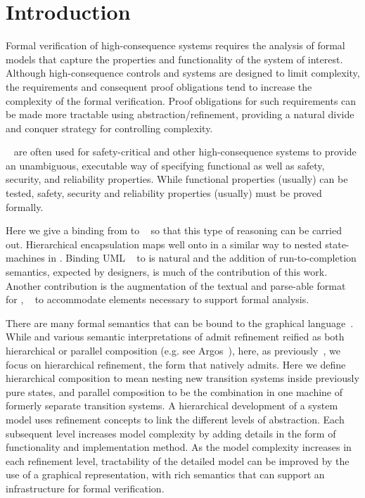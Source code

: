 
\section{Introduction}
\label{sec:introduction}

Formal verification of high-consequence systems requires the analysis
of formal models that capture the properties and functionality of the
system of interest. Although high-consequence controls and systems are
designed to limit complexity, the requirements and consequent proof
obligations tend to increase the complexity of the formal verification.  
Proof obligations for such requirements can be made more tractable using
abstraction/refinement, providing a natural divide and conquer
strategy for controlling complexity.

\Statecharts~\cite{Harel} are often used for safety-critical and other high-consequence systems to provide an unambiguous, executable way of specifying functional as well as safety, security, and reliability properties.  
While functional properties (usually) can be tested, safety, security and reliability properties (usually) must be proved formally.  

Here we give a binding from \Statecharts to \EventB~\cite{abrial10:_model_event_b} so that this type of reasoning can be carried out.
Hierarchical encapsulation maps well onto \Statecharts in a similar way to nested state-machines in \iUMLB.
Binding UML \Statecharts~\cite{Rumbaugh2004} to \iUMLB is natural and the addition of run-to-completion semantics, expected by \Statechart
designers, is much of the contribution of this work.  
Another contribution is the augmentation of the textual and parse-able format for \Statecharts, \SCXML~\cite{scxmlwebsite} to accommodate elements necessary to support formal analysis. 

There are many formal semantics that can be bound to 
 the \Statechart graphical language~\cite{Eshuis_2009}. While \Statecharts and various semantic interpretations of
\Statecharts admit refinement reified as both hierarchical or parallel
composition (e.g. see Argos~\cite{Maraninchi91theargos}), here, as
previously~\cite{snook14:_b_statem}, we focus on hierarchical
refinement, the form that \EventB natively admits.  Here we define
hierarchical composition to mean nesting new transition systems inside
previously pure states, and parallel composition to be the combination
in one machine of formerly separate transition systems.
A hierarchical development of a system model uses refinement
concepts to link the different levels of abstraction. Each subsequent
level increases model complexity by adding details in the form of
functionality and implementation method. As the model complexity
increases in each refinement level, tractability of the detailed model
can be improved by the use of a graphical representation, with rich
semantics that can support an infrastructure for formal verification.


